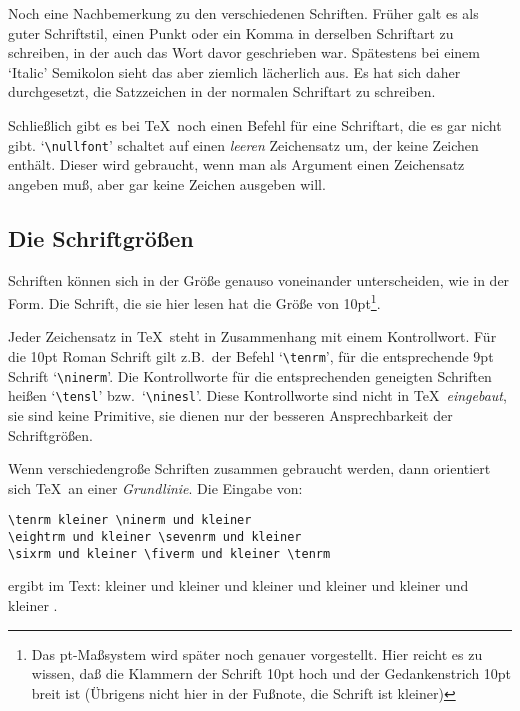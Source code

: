 Noch eine Nachbemerkung zu den verschiedenen Schriften. Fr\"uher galt es
als guter Schriftstil, einen 
Punkt oder ein Komma in derselben
Schriftart zu schreiben, in der auch das Wort davor geschrieben war.
Sp\"atestens bei einem `Italic' Semikolon sieht das aber ziemlich
l\"acherlich aus. Es hat sich daher durchgesetzt, die
Satzzeichen in der
normalen Schriftart zu schreiben.

Schlie\ss{}lich gibt es bei \TeX\ noch einen Befehl f\"ur eine Schriftart,
die es gar nicht gibt. 
`\verb|\nullfont|' schaltet auf einen {\em
leeren} Zeichensatz um, der keine Zeichen enth\"alt. Dieser wird
gebraucht, wenn man als 
Argument einen Zeichensatz angeben mu\ss{}, aber
gar keine Zeichen ausgeben will.

\subsection{Die Schriftgr\"o\ss{}en}
Schriften k\"onnen sich in der Gr\"o\ss{}e genauso voneinander unterscheiden,
wie in der Form. Die Schrift, die sie hier lesen hat die Gr\"o\ss{}e von
10pt\footnote{Das pt-Ma\ss{}system wird sp\"ater noch genauer vorgestellt.
Hier reicht es zu wissen, da\ss{} die 
Klammern der Schrift 10pt hoch und
der 
Gedankenstrich 10pt breit ist (\"Ubrigens nicht hier in der
Fu\ss{}note,
die Schrift ist kleiner)}.

Jeder Zeichensatz in \TeX\ steht in Zusammenhang mit einem
Kontrollwort. F\"ur die 10pt Roman Schrift gilt z.B.\ der Befehl
`\verb|\tenrm|', f\"ur die entsprechende 9pt Schrift `\verb|\ninerm|'.
Die Kontrollworte f\"ur die entsprechenden geneigten Schriften hei\ss{}en
`\verb|\tensl|' bzw.\ `\verb|\ninesl|'. Diese Kontrollworte sind nicht
in \TeX\ {\em eingebaut}, sie sind keine 
Primitive, sie dienen nur der
besseren Ansprechbarkeit der Schriftgr\"o\ss{}en.

Wenn verschiedengro\ss{}e Schriften zusammen gebraucht werden, dann
orientiert sich \TeX\ an einer 
{\em Grundlinie}. Die Eingabe von:
\begin{verbatim}
\tenrm kleiner \ninerm und kleiner
\eightrm und kleiner \sevenrm und kleiner
\sixrm und kleiner \fiverm und kleiner \tenrm
\end{verbatim}
ergibt im Text: \tenrm kleiner \ninerm und kleiner \eightrm und
kleiner \sevenrm und kleiner \sixrm und kleiner \fiverm und
kleiner \tenrm.

